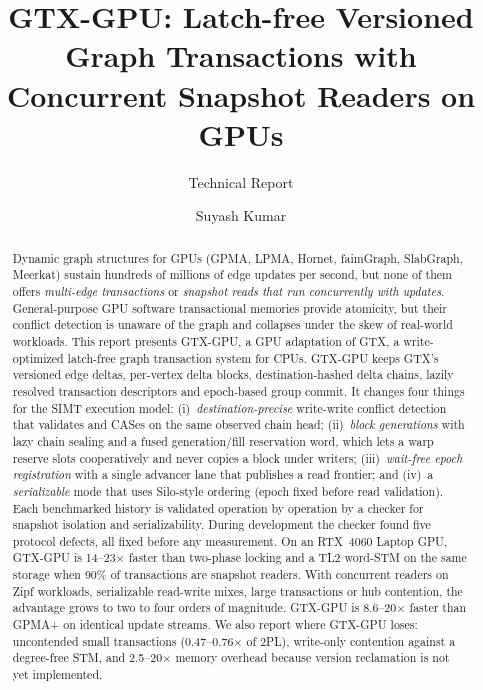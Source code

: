 \documentclass[sigconf,nonacm]{acmart}
\newcommand{\sys}{GTX-GPU}
\begin{document}
\title{\sys{}: Latch-free Versioned Graph Transactions with Concurrent Snapshot Readers on GPUs}
\subtitle{Technical Report}

\author{Suyash Kumar}

\begin{abstract}
Dynamic graph structures for GPUs (GPMA, LPMA, Hornet, faimGraph, SlabGraph, Meerkat) sustain hundreds of millions of
edge updates per second, but none of them offers \emph{multi-edge transactions} or \emph{snapshot reads that run
concurrently with updates}. General-purpose GPU software transactional memories provide atomicity, but their conflict
detection is unaware of the graph and collapses under the skew of real-world workloads. This report presents
\sys{}, a GPU adaptation of GTX, a write-optimized latch-free graph transaction system for CPUs. \sys{} keeps GTX's
versioned edge deltas, per-vertex delta blocks, destination-hashed delta chains, lazily resolved transaction
descriptors and epoch-based group commit. It changes four things for the SIMT execution model:
(i)~\emph{destination-precise} write-write conflict detection that validates and CASes on the same observed chain head;
(ii)~\emph{block generations} with lazy chain sealing and a fused generation/fill reservation word, which lets a warp
reserve slots cooperatively and never copies a block under writers;
(iii)~\emph{wait-free epoch registration} with a single advancer lane that publishes a read frontier; and
(iv)~a \emph{serializable} mode that uses Silo-style ordering (epoch fixed before read validation).
Each benchmarked history is validated operation by operation by a checker for snapshot isolation and
serializability. During development the checker found five protocol defects, all fixed before any measurement.
On an RTX~4060 Laptop GPU, \sys{} is 14--23$\times$ faster than two-phase locking and a TL2 word-STM on the same
storage when 90\% of transactions are snapshot readers. With concurrent readers on Zipf workloads, serializable
read-write mixes, large transactions or hub contention, the advantage grows to two to four orders of magnitude.
\sys{} is 8.6--20$\times$ faster than GPMA+ on identical update streams. We also report where \sys{} loses:
uncontended small transactions (0.47--0.76$\times$ of 2PL), write-only contention against a degree-free STM, and
2.5--20$\times$ memory overhead because version reclamation is not yet implemented.
\end{abstract}
\end{document}

